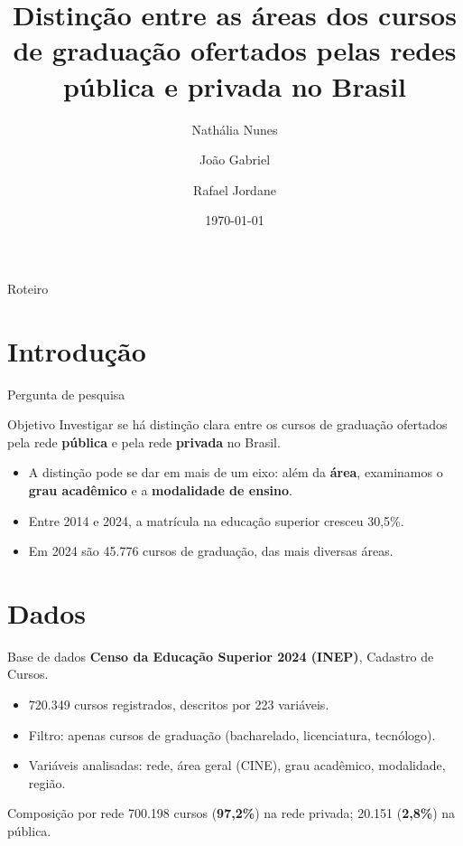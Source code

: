 \documentclass{beamer}
\title[Rede pública x privada]{Distinção entre as áreas dos cursos de graduação ofertados pelas redes pública e privada no Brasil}
\author{Nathália Nunes \and João Gabriel \and Rafael Jordane}
\institute{Departamento de Estatística -- UFES \\ Disciplina: Dados Categóricos}
\date{\today}
\begin{document}
\begin{frame}
  \titlepage
\end{frame}

\begin{frame}{Roteiro}
  \tableofcontents
\end{frame}

\section{Introdução}

\begin{frame}{Pergunta de pesquisa}
  \begin{block}{Objetivo}
    Investigar se há distinção clara entre os cursos de graduação ofertados pela rede \textbf{pública} e pela rede \textbf{privada} no Brasil.
  \end{block}
  \begin{itemize}
    \item A distinção pode se dar em mais de um eixo: além da \textbf{área}, examinamos o \textbf{grau acadêmico} e a \textbf{modalidade de ensino}.
    \item Entre 2014 e 2024, a matrícula na educação superior cresceu 30,5\%.
    \item Em 2024 são 45.776 cursos de graduação, das mais diversas áreas.
  \end{itemize}
\end{frame}

\section{Dados}

\begin{frame}{Base de dados}
  \textbf{Censo da Educação Superior 2024 (INEP)}, Cadastro de Cursos.
  \begin{itemize}
    \item 720.349 cursos registrados, descritos por 223 variáveis.
    \item Filtro: apenas cursos de graduação (bacharelado, licenciatura, tecnólogo).
    \item Variáveis analisadas: rede, área geral (CINE), grau acadêmico, modalidade, região.
  \end{itemize}
  \begin{block}{Composição por rede}
    700.198 cursos (\textbf{97,2\%}) na rede privada; 20.151 (\textbf{2,8\%}) na pública.
  \end{block}
\end{frame}
\end{document}
